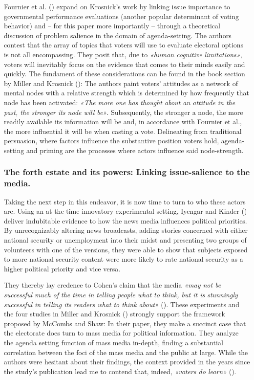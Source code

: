 \documentclass[11pt,a4paper]{article}
\begin{document}
Fournier et al. (\citeyear{fournier_issue_2003}) expand on Krosnick’s work by linking issue importance to governmental performance evaluations (another popular determinant of voting behavior) and – for this paper more importantly – through a theoretical discussion of problem salience in the domain of agenda-setting. The authors contest that the array of topics that voters will use to evaluate electoral options is not all encompassing. They posit that, due to \textit{«human cognitive limitations»}, voters will inevitably focus on the evidence that comes to their minds easily and quickly. The fundament of these considerations can be found in the book section by Miller and Krosnick (\citeyear{miller_news_1996}): The authors paint voters’ attitudes as a network of mental nodes with a relative strength which is determined by how frequently that node has been activated: \textit{«The more one has thought about an attitude in the past, the stronger its node will be»}. Subsequently, the stronger a node, the more readily available its information will be and, in accordance with Fournier et al., the more influential it will be when casting a vote. Delineating from traditional persuasion, where factors influence the substantive position voters hold, agenda-setting and priming are the processes where actors influence said node-strength.

\subsubsection{The forth estate and its powers: Linking issue-salience to the media.}
Taking the next step in this endeavor, it is now time to turn to who these actors are. Using an at the time innovatory experimental setting, Iyengar and Kinder (\citeyear{iyengar_news_1987}) deliver indubitable evidence to how the news media influences political priorities. By unrecognizably altering news broadcasts, adding stories concerned with either national security or unemployment into their midst and presenting two groups of volunteers with one of the versions, they were able to show that subjects exposed to more national security content were more likely to rate national security as a higher political priority and vice versa. 

They thereby lay credence to Cohen’s claim that the media \textit{«may not be successful much of the time in telling people what to think, but it is stunningly successful in telling its readers what to think about»} (\cite{cohen_press_1964}). These experiments and the four studies in Miller and Krosnick (\citeyear{miller_news_1996}) strongly support the framework proposed by McCombs and Shaw: In their paper, they make a succinct case that the electorate does turn to mass media for political information. They analyze the agenda setting function of mass media in-depth, finding a substantial correlation between the foci of the mass media and the public at large. While the authors were hesitant about their findings, the context provided in the years since the study’s publication lead me to contend that, indeed, \textit{«voters do learn»} (\cite{mccombs_agenda-setting_1972}).
\end{document}
